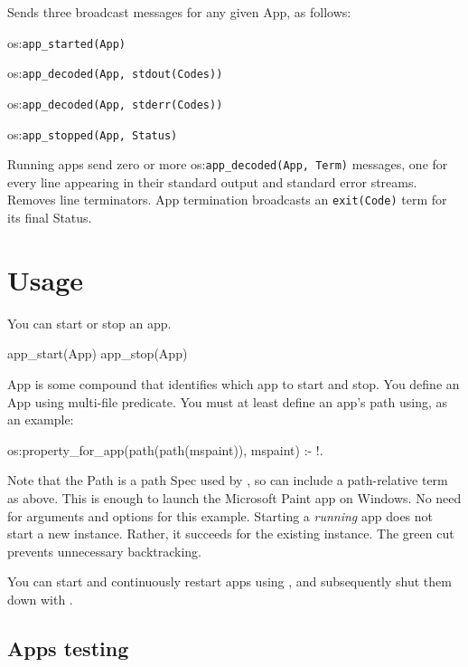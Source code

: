 Sends three broadcast messages for any given App, as follows:

\begin{shortlist}
    \item os:\verb$app_started(App)$
    \item os:\verb$app_decoded(App, stdout(Codes))$
    \item os:\verb$app_decoded(App, stderr(Codes))$
    \item os:\verb$app_stopped(App, Status)$
\end{shortlist}

Running apps send zero or more os:\verb$app_decoded(App, Term)$ messages,
one for every line appearing in their standard output and standard
error streams. Removes line terminators. App termination broadcasts
an \verb$exit(Code)$ term for its final Status.

\section{Usage}

You can start or stop an app.

\begin{code}
app_start(App)
app_stop(App)
\end{code}

App is some compound that identifies which app to start and stop. You define an
App using  multi-file predicate. You must at least define
an app's path using, as an example:

\begin{code}
os:property_for_app(path(path(mspaint)), mspaint) :- !.
\end{code}

Note that the Path is a path Spec used by , so can include a
path-relative term as above. This is enough to launch the Microsoft Paint app on
Windows. No need for arguments and options for this example. Starting a \textit{running}
app does not start a new instance. Rather, it succeeds for the existing
instance. The green cut prevents unnecessary backtracking.

You can start and continuously restart apps using , and subsequently
shut them down with .

\subsection{Apps testing}

